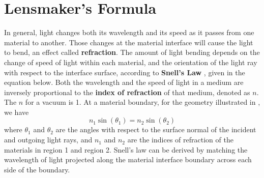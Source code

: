\section{Lensmaker's Formula}
\label{sect:lensmaker}

In general, light changes both its wavelength and its speed as it passes from one material to another.  Those changes at the material interface
will cause the light to bend, an effect called {\bf refraction}.  The amount of light bending depends on the change of speed of light within each material, and the orientation of the light ray with respect to the interface surface, according to {\bf Snell's Law} \cite{Hecht2016}, given in the equation below.  Both the wavelength and the speed of light in a medium are inversely proportional to the {\bf index of refraction} of that medium, denoted as $n$.  The $n$ for a vacuum is 1.  At a material boundary, for the geometry illustrated in \fig{\ref{fig:snell}}, we have
\begin{equation}
n_1 \sin(\theta_1) = n_2 \sin(\theta_2)
\end{equation}
where $\theta_1$ and  $\theta_2$ are the angles with respect to the surface normal of the incident and outgoing light rays, and $n_1$ and $n_2$ are the  indices of refraction of the materials in region 1 and region 2. Snell's law can be derived by matching the wavelength of light projected along the material interface boundary across each side of the boundary.


